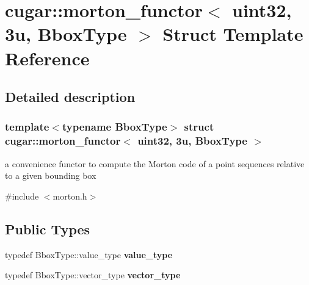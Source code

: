 \hypertarget{structcugar_1_1morton__functor_3_01uint32_00_013u_00_01_bbox_type_01_4}{}\section{cugar\+:\+:morton\+\_\+functor$<$ uint32, 3u, Bbox\+Type $>$ Struct Template Reference}
\label{structcugar_1_1morton__functor_3_01uint32_00_013u_00_01_bbox_type_01_4}


\subsection{Detailed description}
\subsubsection*{template$<$typename Bbox\+Type$>$\newline
struct cugar\+::morton\+\_\+functor$<$ uint32, 3u, Bbox\+Type $>$}

a convenience functor to compute the Morton code of a point sequences relative to a given bounding box 

{\ttfamily \#include $<$morton.\+h$>$}

\subsection*{Public Types}
\begin{DoxyCompactItemize}
\item 
\mbox{\label{structcugar_1_1morton__functor_3_01uint32_00_013u_00_01_bbox_type_01_4_a6fbfad2503596a20e9a2de48339f4c7b}} 
typedef Bbox\+Type\+::value\+\_\+type {\bfseries value\+\_\+type}
\item 
\mbox{\label{structcugar_1_1morton__functor_3_01uint32_00_013u_00_01_bbox_type_01_4_ab840861d24f217e1d59721b7a3fffa59}} 
typedef Bbox\+Type\+::vector\+\_\+type {\bfseries vector\+\_\+type}
\end{DoxyCompactItemize}
